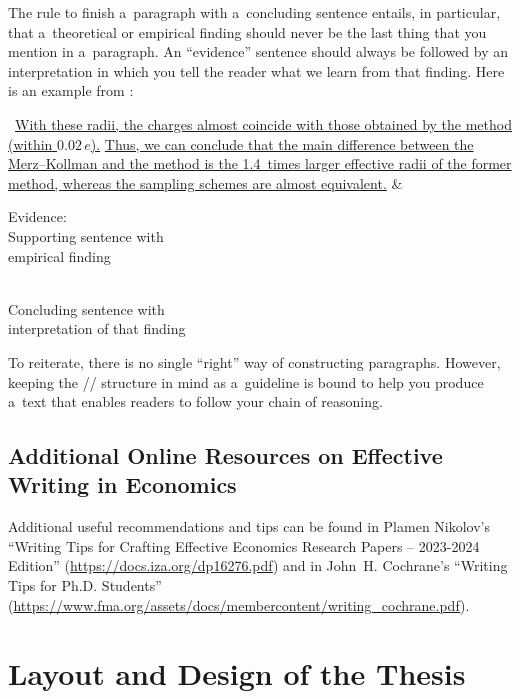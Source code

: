 The rule to finish a~paragraph with a~concluding sentence entails, in particular, that a~theoretical or empirical finding should never be the last thing that you mention in a~paragraph. An ``evidence'' sentence should always be followed by an interpretation in which you tell the reader what we learn from that finding. Here is an example from \citet{sigfridsson}:

\begingroup
	\begin{longtblr}{}
		\textellipsis\ {\ul{With these radii, the charges almost coincide with those obtained by the \mbox{} method (within ${0.02\,e}$).}}
		{\ul{Thus, we can conclude that the main difference between the Merz--Kollman and the \mbox{} method is the 1.4~times larger effective radii of the former method, whereas the sampling schemes are almost equivalent.}}
		&
		{%
			\textcolor{DeepPink4}{Evidence:} \\
			\textcolor{DeepPink4}{Supporting sentence with} \\
			\textcolor{DeepPink4}{empirical finding} \\
			\strut \\
			\textcolor{DarkOrchid3}{Concluding sentence with} \\
			\textcolor{DarkOrchid3}{interpretation of that finding}%
		}
	\end{longtblr}
\endgroup

To reiterate, there is no single ``right'' way of constructing paragraphs. However, keeping the // structure in mind as a~guideline is bound to help you produce a~text that enables readers to follow your chain of reasoning.

\endgroup

\subsection{Additional Online Resources on Effective Writing in Economics}

Additional useful recommendations and tips can be found in Plamen Nikolov's ``Writing Tips for Crafting Effective Economics Research Papers -- 2023-2024 Edition'' (\url{https://docs.iza.org/dp16276.pdf}) and in John~H. Cochrane's ``Writing Tips for Ph.D. Students'' (\url{https://www.fma.org/assets/docs/membercontent/writing_cochrane.pdf}).


\section{Layout and Design of the Thesis}
\label{sec:layout}

